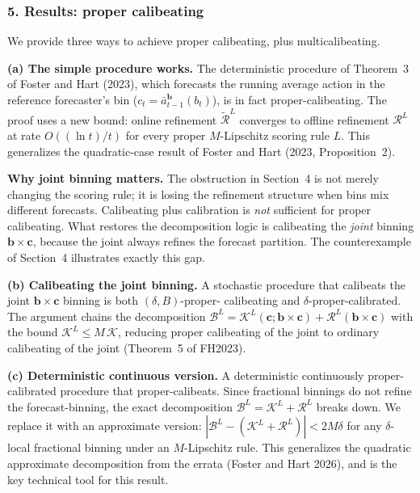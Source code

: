 
\subsubsection*{5. Results: proper calibeating}

We provide three ways to achieve proper calibeating, plus
multicalibeating.

\medskip\noindent\textbf{(a) The simple procedure works.}
The deterministic procedure of Theorem~3 of Foster and Hart (2023),
which forecasts the running average action in the reference forecaster's
bin ($c_{t} = \bar{a}_{t-1}^{\mathbf{b}}(b_{t})$), is in fact
proper-calibeating.  The proof uses a new bound: online refinement
$\widetilde{\mathcal{R}}^{L}$ converges to offline refinement
$\mathcal{R}^{L}$ at rate $O((\ln t)/t)$ for every proper
$M$-Lipschitz scoring rule $L$.  This generalizes the quadratic-case
result of Foster and Hart (2023, Proposition~2).

\medskip\noindent\textbf{Why joint binning matters.}
The obstruction in Section~4 is not merely changing the scoring rule; it
is losing the refinement structure when bins mix different forecasts.
Calibeating plus calibration is \emph{not} sufficient for proper
calibeating.  What restores the decomposition logic is calibeating the
\emph{joint} binning $\mathbf{b}\times\mathbf{c}$, because the joint
always refines the forecast partition.  The counterexample of Section~4
illustrates exactly this gap.

\medskip\noindent\textbf{(b) Calibeating the joint binning.}
A stochastic procedure that calibeats the joint
$\mathbf{b}\times\mathbf{c}$ binning is both $(\delta,B)$-proper-%
calibeating and $\delta$-proper-calibrated.  The argument chains
the decomposition $\mathcal{B}^{L} = \mathcal{K}^{L}(\mathbf{c};
\mathbf{b}\times\mathbf{c}) + \mathcal{R}^{L}(\mathbf{b}\times
\mathbf{c})$ with the bound $\mathcal{K}^{L} \leq M\,\mathcal{K}$,
reducing proper calibeating of the joint to ordinary calibeating of the
joint (Theorem~5 of FH2023).

\medskip\noindent\textbf{(c) Deterministic continuous version.}
A deterministic continuously proper-calibrated procedure that
proper-calibeats.  Since fractional binnings do not refine the
forecast-binning, the exact decomposition
$\mathcal{B}^{L} = \mathcal{K}^{L} + \mathcal{R}^{L}$ breaks down.
We replace it with an approximate version:
$|\mathcal{B}^{L} - (\mathcal{K}^{L} + \mathcal{R}^{L})| < 2M\delta$
for any $\delta$-local fractional binning under an $M$-Lipschitz rule.
This generalizes the quadratic approximate decomposition from the errata
(Foster and Hart 2026), and is the key technical tool for this result.

